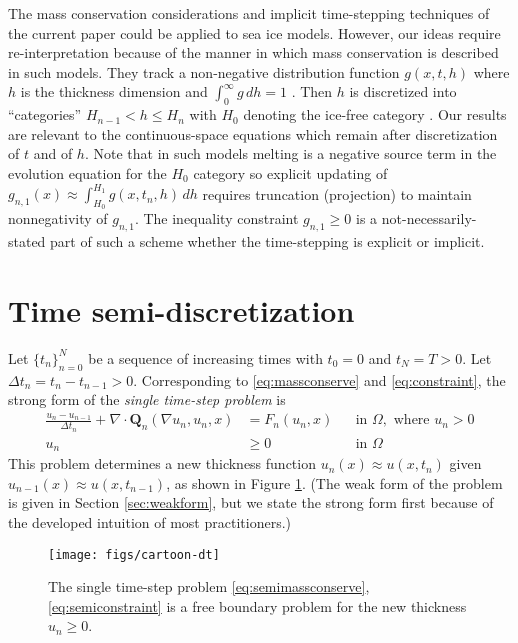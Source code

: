\documentclass[final,onefignum]{siamart190516}
\newcommand\bQ{\mathbf{Q}}
\newcommand{\Div}{\nabla\cdot}
\newcommand{\grad}{\nabla}
\begin{document}
The mass conservation considerations and implicit time-stepping techniques of the current paper could be applied to sea ice models.  However, our ideas require re-interpretation because of the manner in which mass conservation is described in such models.  They track a non-negative distribution function $g(x,t,h)$ where $h$ is the thickness dimension and $\int_0^\infty g\,dh = 1$ \cite{Thorndikeetal1975}.  Then $h$ is discretized into ``categories'' $H_{n-1} < h \le H_n$ with $H_0$ denoting the ice-free category \cite{LipscombHunke2004}.  Our results are relevant to the continuous-space equations which remain after discretization of $t$ and of $h$.  Note that in such models melting is a negative source term in the evolution equation for the $H_0$ category so explicit updating of $g_{n,1}(x) \approx \int_{H_0}^{H_1} g(x,t_n,h)\,dh$ requires truncation (projection) to maintain nonnegativity of $g_{n,1}$.  The inequality constraint $g_{n,1} \ge 0$ is a not-necessarily-stated part of such a scheme whether the time-stepping is explicit or implicit.


\section{Time semi-discretization}  \label{sec:strongform}

Let $\{t_n\}_{n=0}^N$ be a sequence of increasing times with $t_0=0$ and $t_N=T>0$.  Let $\Delta t_n = t_n-t_{n-1}>0$.  Corresponding to \eqref{eq:massconserve} and \eqref{eq:constraint}, the strong form of the \emph{single time-step problem} is
\begin{align}
\frac{u_n - u_{n-1}}{\Delta t_n} + \Div \bQ_n(\grad u_n,u_n,x) &= F_n(u_n,x) &&\text{in } \Omega, \text{ where } u_n > 0 \label{eq:semimassconserve} \\
u_n &\ge 0 &&\text{in } \Omega \label{eq:semiconstraint}
\end{align}
This problem determines a new thickness function $u_n(x) \approx u(x,t_n)$ given $u_{n-1}(x) \approx u(x,t_{n-1})$, as shown in Figure \ref{fig:timestepcartoon}.  (The weak form of the problem is given in Section \ref{sec:weakform}, but we state the strong form first because of the developed intuition of most practitioners.)

\begin{figure}[ht]
\begin{center}
\texttt{[image: figs/cartoon-dt]}
\end{center}
\caption{The single time-step problem \eqref{eq:semimassconserve}, \eqref{eq:semiconstraint} is a free boundary problem for the new thickness $u_n\ge 0$.}
\label{fig:timestepcartoon}
\end{figure}
\end{document}
